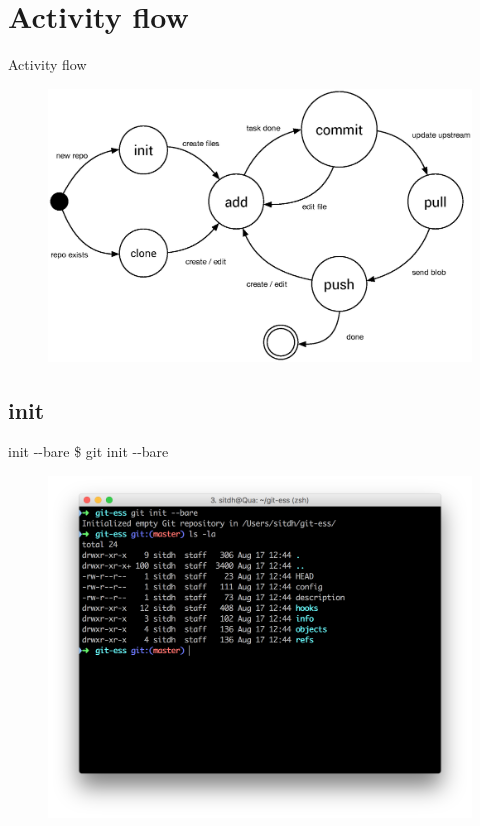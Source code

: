 \documentclass{beamer}
\begin{document}
\section{Activity flow}
\begin{frame}{Activity flow}
    \begin{figure}
        \center
        \includegraphics[width=.9\textwidth]{git-command-flow}
        \label{fig:git-command-flow}
    \end{figure}
\end{frame}

\subsection{init}
\begin{frame}{init -{}-bare}
    \Large{\$ git init -{}-bare}
    \begin{figure}
        \center
        \includegraphics[width=.9\textwidth]{git-init--bare}
        \label{fig:git-init--bare}
    \end{figure}
\end{frame}
\end{document}
